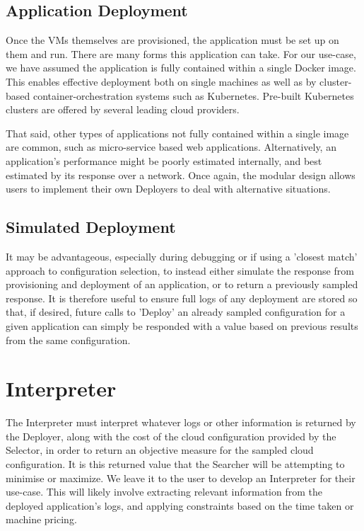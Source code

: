 \documentclass{report}
\begin{document}
\subsection{Application Deployment}
Once the VMs themselves are provisioned, the application must be set up on them and run. There are many forms this application can take. For our use-case, we have assumed the application is fully contained within a single Docker image. This enables effective deployment both on single machines as well as by cluster-based container-orchestration systems such as Kubernetes. Pre-built Kubernetes clusters are offered by several leading cloud providers. 

That said, other types of applications not fully contained within a single image are common, such as micro-service based web applications. Alternatively, an application's performance might be poorly estimated internally, and best estimated by its response over a network. Once again, the modular design allows users to implement their own Deployers to deal with alternative situations.

\subsection{Simulated Deployment}
It may be advantageous, especially during debugging or if using a 'closest match' approach to configuration selection, to instead either simulate the response from provisioning and deployment of an application, or to return a previously sampled response. It is therefore useful to ensure full logs of any deployment are stored so that, if desired, future calls to 'Deploy' an already sampled configuration for a given application can simply be responded with a value based on previous results from the same configuration.

\section{Interpreter}
The Interpreter must interpret whatever logs or other information is returned by the Deployer, along with the cost of the cloud configuration provided by the Selector, in order to return an objective measure for the sampled cloud configuration. It is this returned value that the Searcher will be attempting to minimise or maximize. We leave it to the user to develop an Interpreter for their use-case. This will likely involve extracting relevant information from the deployed application's logs, and applying constraints based on the time taken or machine pricing. 
\end{document}
